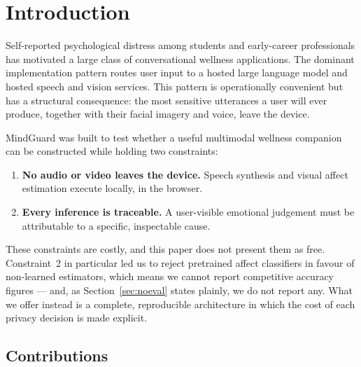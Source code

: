 \documentclass[runningheads]{llncs}
\begin{document}
\section{Introduction}
\label{sec:intro}

Self-reported psychological distress among students and early-career
professionals has motivated a large class of conversational wellness
applications. The dominant implementation pattern routes user input to a
hosted large language model and hosted speech and vision services. This
pattern is operationally convenient but has a structural consequence: the
most sensitive utterances a user will ever produce, together with their
facial imagery and voice, leave the device.

MindGuard was built to test whether a useful multimodal wellness companion
can be constructed while holding two constraints:

\begin{enumerate}
\item \textbf{No audio or video leaves the device.} Speech synthesis and
visual affect estimation execute locally, in the browser.
\item \textbf{Every inference is traceable.} A user-visible emotional
judgement must be attributable to a specific, inspectable cause.
\end{enumerate}

These constraints are costly, and this paper does not present them as free.
Constraint~2 in particular led us to reject pretrained affect classifiers in
favour of non-learned estimators, which means we cannot report competitive
accuracy figures --- and, as Section~\ref{sec:noeval} states plainly, we do not
report any. What we offer instead is a complete, reproducible architecture in
which the cost of each privacy decision is made explicit.

\subsection{Contributions}
\end{document}
